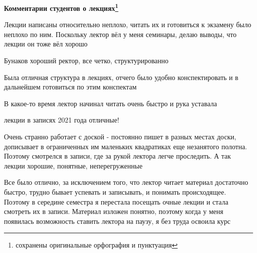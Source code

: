		\textbf{Комментарии студентов о лекциях\protect\footnote{сохранены оригинальные орфография и пунктуация}}
            \begin{commentbox} 
                Лекции написаны относительно неплохо, читать их и готовиться к экзамену было неплохо по ним. Поскольку лектор вёл у меня семинары, делаю выводы, что лекции он тоже вёл хорошо 
            \end{commentbox} 
        
            \begin{commentbox} 
                Бунаков хороший ректор, все четко, структурированно 
            \end{commentbox} 
        
            \begin{commentbox} 
                Была отличная структура в лекциях, отчего было удобно конспектировать и в дальнейшем готовиться по этим конспектам 
            \end{commentbox} 
        
            \begin{commentbox} 
                В какое-то время лектор начинал читать очень быстро и рука уставала 
            \end{commentbox} 
        
            \begin{commentbox} 
                лекции в записях 2021 года отличные! 
            \end{commentbox} 
        
            \begin{commentbox} 
                Очень странно работает с доской - постоянно пишет в разных местах доски, дописывает в ограниченных им маленьких квадратиках еще незанятого полотна. Поэтому смотрелся в записи, где за рукой лектора легче проследить. А так лекции хорошие, понятные, неперегруженные 
            \end{commentbox} 
        
            \begin{commentbox} 
                Все было отлично, за исключением того, что лектор читает материал достаточно быстро, трудно бывает успевать и записывать, и понимать происходящее. Поэтому в середине семестра я перестала посещать очные лекции и стала смотреть их в записи. Материал изложен понятно, поэтому когда у меня появилась возможность ставить лектора на паузу, я без труда освоила курс 
            \end{commentbox} 
        
